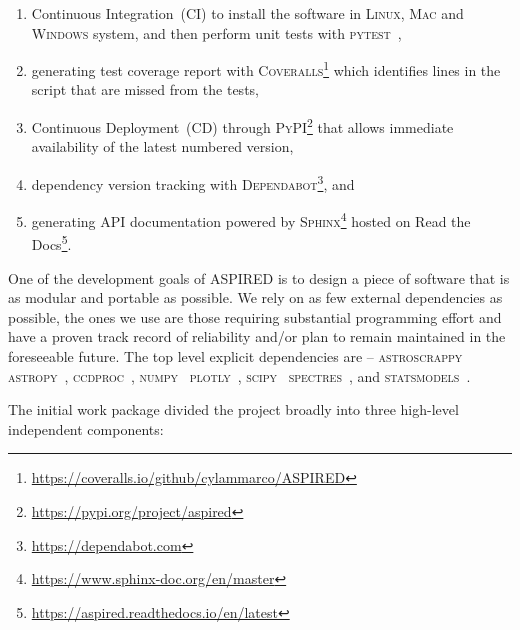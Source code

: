 \documentclass[fleqn,usenatbib]{mnras}
\begin{document}
\begin{enumerate}
    \item Continuous Integration~(CI) to install the software in \textsc{Linux}, \textsc{Mac} and \textsc{Windows} system, and then perform unit tests with \textsc{pytest}~\citep{pytest6.2},
    \item generating test coverage report with \textsc{Coveralls}\footnote{\url{https://coveralls.io/github/cylammarco/ASPIRED}} which identifies lines in the script that are missed from the tests,
    \item Continuous Deployment~(CD) through \textsc{PyPI}\footnote{\url{https://pypi.org/project/aspired}} that allows immediate availability of the latest numbered version,
    \item dependency version tracking with \textsc{Dependabot}\footnote{\url{https://dependabot.com}}, and
    \item generating API documentation powered by \textsc{Sphinx}\footnote{\url{https://www.sphinx-doc.org/en/master}} hosted on Read the Docs\footnote{\url{https://aspired.readthedocs.io/en/latest}}.
\end{enumerate}

One of the development goals of ASPIRED is to design a piece of software that is as
modular and portable as possible. We rely on as few external dependencies as possible,
the ones we use are those requiring substantial programming effort and have a
proven track record of reliability and/or plan to remain maintained in the
foreseeable future. The top level explicit dependencies are --
\textsc{astroscrappy}~\citep{curtis_mccully_2018_1482019, 2001PASP..113.1420V}
\textsc{astropy}~\citep{astropy:2013, astropy:2018},
\textsc{ccdproc}~\citep{matt_craig_2017_1069648},
\textsc{numpy}~\citep{2020NumPy-Array}
\textsc{plotly}~\citep{plotly},
\textsc{scipy}~\citep{2020SciPy-NMeth}
\textsc{spectres}~\citep{2017arXiv170505165C}, and
\textsc{statsmodels}~\citep{seabold2010statsmodels}. 


The initial
work package divided the project broadly into three high-level independent
components:
\end{document}
